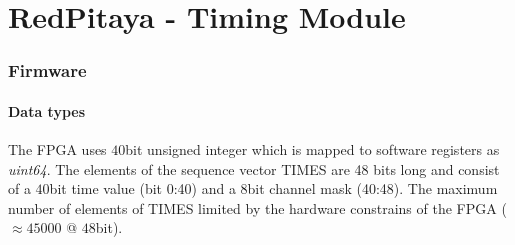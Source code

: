 \documentclass{article}
\begin{document}
\thispagestyle{empty}
\part*{\center RedPitaya - Timing Module}
\section*{Firmware}
\subsection*{Data types}
The FPGA uses $40$bit unsigned integer which is mapped to software registers as \textit{uint64}.
The elements of the sequence vector TIMES are 48 bits long and consist of a $40$bit time value (bit 0:40) and a $8$bit channel mask (40:48).
The maximum number of elements of TIMES limited by the  hardware constrains of the FPGA ($\approx 45000$ @ $48$bit).
\end{document}

